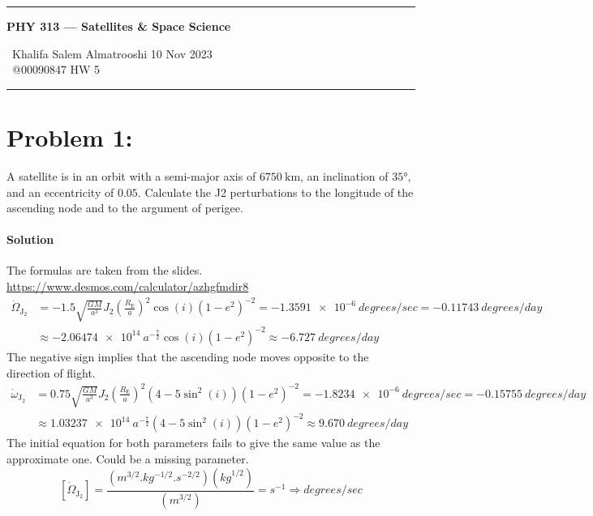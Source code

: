\documentclass{article}
\begin{document}
	
	\begin{center}
		\hrule
		\vspace{0.4cm}
		\textbf { \large PHY 313 --- Satellites \& Space Science}
		\vspace{0.4cm}
	\end{center}
		 \ Khalifa Salem Almatrooshi \hspace{\fill}  10 Nov 2023 \\
		 \ @00090847 \hspace{\fill}  HW 5 \\
		\hrule	
	
	\section*{Problem 1: }
	A satellite is in an orbit with a semi-major axis of $\qty{6750}{\kilo\meter}$, an inclination of $\ang{35}$, and an eccentricity of $\num{0.05}$.  Calculate the J2 perturbations to the longitude of the ascending node and to the argument of perigee.
		\paragraph{Solution} The formulas are taken from the slides. \hyperlink{https://www.desmos.com/calculator/azhgfmdir8}{https://www.desmos.com/calculator/azhgfmdir8} \\
			
			\begin{equation*}
				\begin{split}
					\dot{\Omega}_\mathrm{J_2} &= -1.5 \sqrt{\frac{GM}{a^3}} J_2 \left( \frac{R_\mathrm{E}}{a} \right)^2 \cos(i) \left( 1-e^2 \right)^{-2} = \qty{-1.3591e-6}{degrees/sec} = \qty{-0.11743}{degrees/day} \\
					&\approx \num{-2.06474e14} \ a^{-\frac{7}{2}} \cos(i) (1 - e^2)^{-2} \approx \boxed{\qty{-6.727}{degrees/day}}
				\end{split}
			\end{equation*}
			The negative sign implies that the ascending node moves opposite to the direction of flight.
			\begin{equation*}
				\begin{split}
					\dot{\omega}_\mathrm{J_2} &= 0.75 \sqrt{\frac{GM}{a^3}} J_2 \left( \frac{R_\mathrm{E}}{a} \right)^2 \left( 4 - 5\sin^2(i) \right) \left( 1-e^2 \right)^{-2} = \qty{-1.8234e-6}{degrees/sec} = \qty{-0.15755}{degrees/day} \\
					&\approx \num{1.03237e14} \ a^{-\frac{7}{2}} (4-5\sin^2(i)) (1 - e^2)^{-2} \approx \boxed{\qty{9.670}{degrees/day}}
				\end{split}
			\end{equation*}
			The initial equation for both parameters fails to give the same value as the approximate one. Could be a missing parameter.
			\[
				[\dot{\Omega}_\mathrm{J_2}] = \frac{(\unit{m^{3/2}.kg^{-1/2}.s^{-2/2}})(\unit{kg}^{1/2})}{(\unit{m^{3/2}})} = \unit{s^{-1}} \Rightarrow \unit{degrees/sec}
			\]
	
\end{document}
